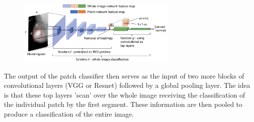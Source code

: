 \begin{figure}[H]
	\centering
	\includegraphics[width=0.7\textwidth]{ML1}
	\label{fig1}
\end{figure}
\noindent The output of the patch classifier then serves as the input of two more blocks of convolutional layers (VGG or Resnet) followed by a global pooling layer. The idea is that these top layers 'scan' over the whole image receiving the classification of the individual patch by the first segment. These information are then pooled to produce a classification of the entire image. 
\newline 
\newline

